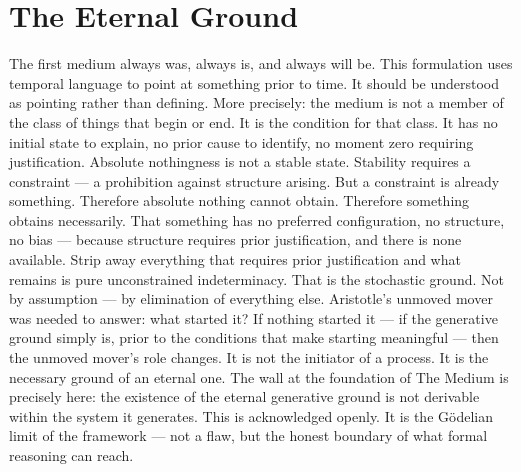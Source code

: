 \documentclass[11pt,letterpaper]{article}
\begin{document}
\section{The Eternal Ground}
\label{sec:orgb809291}
The first medium always was, always is, and always will be.
This formulation uses temporal language to point at something prior to time. It should be understood as pointing rather than defining. More precisely: the medium is not a member of the class of things that begin or end. It is the condition for that class. It has no initial state to explain, no prior cause to identify, no moment zero requiring justification.
Absolute nothingness is not a stable state. Stability requires a constraint — a prohibition against structure arising. But a constraint is already something. Therefore absolute nothing cannot obtain. Therefore something obtains necessarily. That something has no preferred configuration, no structure, no bias — because structure requires prior justification, and there is none available. Strip away everything that requires prior justification and what remains is pure unconstrained indeterminacy. That is the stochastic ground. Not by assumption — by elimination of everything else.
Aristotle's unmoved mover was needed to answer: what started it? If nothing started it — if the generative ground simply is, prior to the conditions that make starting meaningful — then the unmoved mover's role changes. It is not the initiator of a process. It is the necessary ground of an eternal one. The wall at the foundation of The Medium is precisely here: the existence of the eternal generative ground is not derivable within the system it generates. This is acknowledged openly. It is the Gödelian limit of the framework — not a flaw, but the honest boundary of what formal reasoning can reach.
\end{document}
